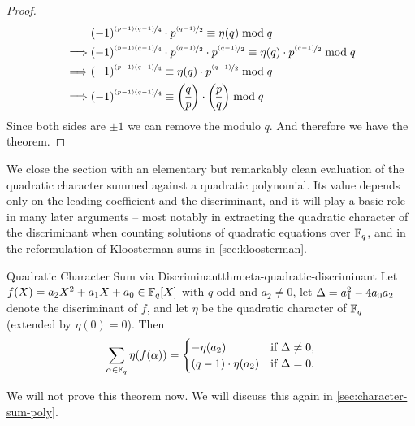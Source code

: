\begin{proof}
\begin{align*}
    & (-1)^{\nicefrac{(p-1)(q-1)}{4}}\cdot p^{\nicefrac{(q-1)}2}\equiv \eta(q)\bmod q\\ 
    \implies & (-1)^{\nicefrac{(p-1)(q-1)}{4}}\cdot p^{\nicefrac{(q-1)}2}\cdot p^{\nicefrac{(q-1)}2}\equiv \eta(q)\cdot p^{\nicefrac{(q-1)}2}\bmod q\\ 
    \implies & (-1)^{\nicefrac{(p-1)(q-1)}{4}}\equiv \eta(q)\cdot p^{\nicefrac{(q-1)}2}\bmod q\\ 
    \implies & (-1)^{\nicefrac{(p-1)(q-1)}{4}}\equiv \Leg{q}{p}\cdot \Leg{p}{q}\bmod q
  \end{align*}Since both sides are $\pm1$ we can remove the modulo $q$. And therefore we have the theorem.
\end{proof}

We close the section with an elementary but remarkably clean evaluation of the quadratic character summed against a quadratic polynomial. Its value depends only on the leading coefficient and the discriminant, and it will play a basic role in many later arguments -- most notably in extracting the quadratic character of the discriminant when counting solutions of quadratic equations over $\mathbb{F}_q$, and in the reformulation of Kloosterman sums in \autoref{sec:kloosterman}.
\begin{Theorem}{Quadratic Character Sum via Discriminant}{thm:eta-quadratic-discriminant}
  Let $f(X)=a_2X^2+a_1X+a_0\in\mathbb{F}_q[X]$ with $q$ odd and $a_2\neq 0$, let $\Delta=a_1^2-4a_0a_2$ denote the discriminant of $f$, and let $\eta$ be the quadratic character of $\mathbb{F}_q$ (extended by $\eta(0)=0$). Then $$\sum_{\alpha\in\mathbb{F}_q}\eta(f(\alpha))=\begin{cases}-\eta(a_2) & \text{if }\Delta\neq 0,\\ (q-1)\cdot \eta(a_2) & \text{if }\Delta=0.\end{cases}$$
\end{Theorem}
We will not prove this theorem now. We will discuss this again in \autoref{sec:character-sum-poly}. 